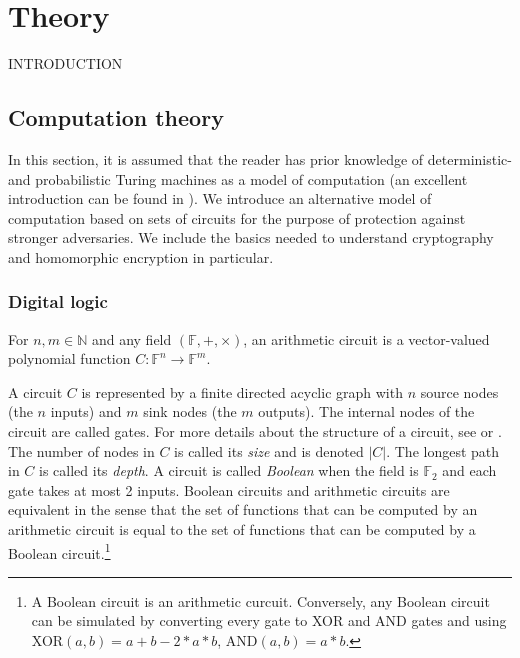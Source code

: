 \chapter{Theory}

INTRODUCTION


\section{Computation theory}
 In this section, it is assumed that the reader has prior knowledge of deterministic- and probabilistic Turing machines as a model of computation (an excellent introduction can be found in \cite{Gol01}). We introduce an alternative model of computation based on sets of circuits for the purpose of protection against stronger adversaries. We include the basics needed to understand cryptography and homomorphic encryption in particular. 

 \subsection*{Digital logic}

\begin{definition}[Circuit]
For $n, m \in \mathbb{N}$ and any field $(\mathbb{F},+,\times)$, an arithmetic circuit is a vector-valued polynomial function $C \colon \mathbb{F}^{n} \to \mathbb{F}^m$. 
\end{definition}

A circuit $C$ is represented by a finite directed acyclic graph with $n$ source nodes (the $n$ inputs) and $m$ sink nodes (the $m$ outputs). The internal nodes of the circuit are called gates. For more details about the structure of a circuit, see \cite{goldreich_2008} or \cite{MF21}. The number of nodes in $C$ is called its \textit{size} and is denoted $|C|$. The longest path in $C$ is called its \textit{depth}.
A circuit is called \textit{Boolean} when the field is $\mathbb{F}_2$ and each gate takes at most 2 inputs. Boolean circuits and arithmetic circuits are equivalent in the sense that the set of functions that can be computed by an arithmetic circuit is equal to the set of functions that can be computed by a Boolean circuit.\footnote{A Boolean circuit is an arithmetic curcuit. Conversely, any Boolean circuit can be simulated by converting every gate to XOR and AND gates and using XOR$(a,b) = a+b-2*a*b$, AND$(a,b) = a*b$.} 

